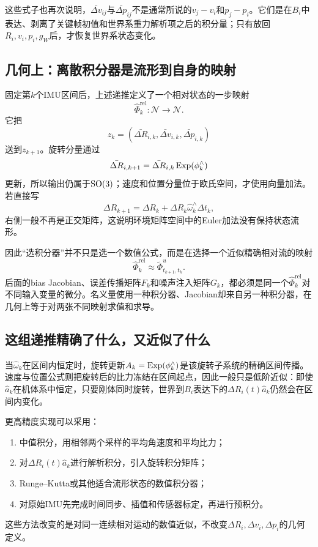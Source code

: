 这些式子也再次说明，$\bar{\Delta v}_{ij}$与$\bar{\Delta p}_{ij}$不是通常所说的$v_j-v_i$和$p_j-p_i$。它们是在$B_i$中表达、剥离了关键帧初值和世界系重力解析项之后的积分量；只有放回$R_i,v_i,p_i,g_W$后，才恢复世界系状态变化。

\subsection{几何上：离散积分器是流形到自身的映射}

固定第$k$个IMU区间后，上述递推定义了一个相对状态的一步映射
\[
    \widehat\Phi_k^{\mathrm{rel}}:
    \mathcal N\to\mathcal N.
\]
它把
\[
    z_k=(\bar{\Delta R}_{i,k},
         \bar{\Delta v}_{i,k},
         \bar{\Delta p}_{i,k})
\]
送到$z_{k+1}$。旋转分量通过
\[
    \bar{\Delta R}_{i,k+1}
    =\bar{\Delta R}_{i,k}\operatorname{Exp}(\phi_k^\wedge)
\]
更新，所以输出仍属于$\operatorname{SO}(3)$；速度和位置分量位于欧氏空间，才使用向量加法。若直接写
\[
    \Delta R_{k+1}
    =\Delta R_k+\Delta R_k\widehat\omega_k^\wedge\Delta t_k,
\]
右侧一般不再是正交矩阵，这说明环境矩阵空间中的Euler加法没有保持状态流形。

因此“选积分器”并不只是选一个数值公式，而是在选择一个近似精确相对流的映射
\[
    \widehat\Phi_k^{\mathrm{rel}}
    \approx
    \widetilde\Phi^u_{t_{k+1},t_k}.
\]
后面的bias Jacobian、误差传播矩阵$F_k$和噪声注入矩阵$G_k$，都必须是同一个$\widehat\Phi_k^{\mathrm{rel}}$对不同输入变量的微分。名义量使用一种积分器、Jacobian却来自另一种积分器，在几何上等于对两张不同映射求值和求导。

\subsection{这组递推精确了什么，又近似了什么}

当$\widehat\omega_k$在区间内恒定时，旋转更新$A_k=\operatorname{Exp}(\phi_k^\wedge)$是该旋转子系统的精确区间传播。速度与位置公式则把旋转后的比力冻结在区间起点，因此一般只是低阶近似：即使$\widehat a_k$在机体系中恒定，只要刚体同时旋转，世界到$B_i$表达下的$\Delta R_i(t)\widehat a_k$仍然会在区间内变化。

更高精度实现可以采用：
\begin{enumerate}
    \item 中值积分，用相邻两个采样的平均角速度和平均比力；
    \item 对$\Delta R_i(t)\widehat a_k$进行解析积分，引入旋转积分矩阵；
    \item Runge--Kutta或其他适合流形状态的数值积分器；
    \item 对原始IMU先完成时间同步、插值和传感器标定，再进行预积分。
\end{enumerate}
这些方法改变的是对同一连续相对运动的数值近似，不改变$\Delta R_i,\Delta v_i,\Delta p_i$的几何定义。

